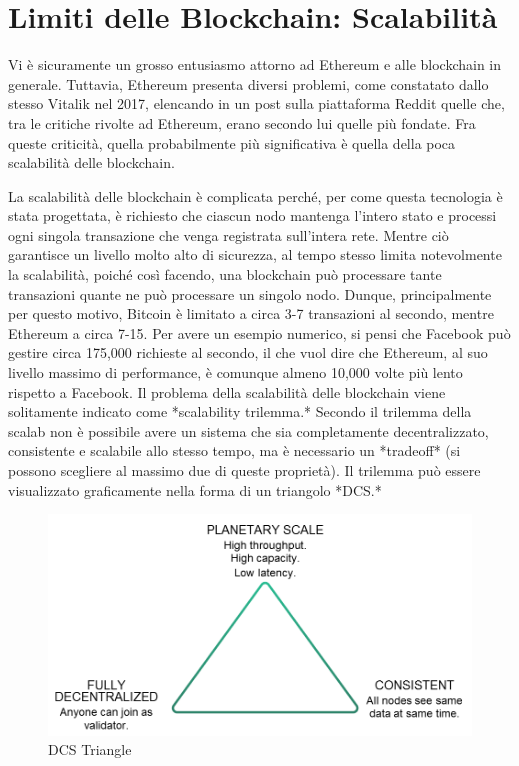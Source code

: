 \section{Limiti delle Blockchain: Scalabilità}

Vi è sicuramente un grosso entusiasmo attorno ad Ethereum e alle blockchain in generale. Tuttavia, Ethereum presenta diversi problemi, come constatato dallo stesso Vitalik nel 2017, elencando in un post sulla piattaforma Reddit quelle che, tra le critiche rivolte ad Ethereum, erano secondo lui quelle più fondate. Fra queste criticità, quella probabilmente più significativa è quella della poca scalabilità delle blockchain.

La scalabilità delle blockchain è complicata perché, per come questa tecnologia è stata progettata, è richiesto che ciascun nodo mantenga l'intero stato e processi ogni singola transazione che venga registrata sull'intera rete. Mentre ciò garantisce un livello molto alto di sicurezza, al tempo stesso limita notevolmente la scalabilità, poiché così facendo, una blockchain può processare tante transazioni quante ne può processare un singolo nodo. Dunque, principalmente per questo motivo, Bitcoin è limitato a circa 3-7 transazioni al secondo, mentre Ethereum a circa 7-15. Per avere un esempio numerico, si pensi che Facebook può gestire circa 175,000 richieste al secondo, il che vuol dire che Ethereum, al suo livello massimo di performance, è comunque almeno 10,000 volte più lento rispetto a Facebook. 
Il problema della scalabilità delle blockchain viene solitamente indicato come *scalability trilemma.* Secondo il trilemma della scalab non è possibile avere un sistema che sia completamente decentralizzato, consistente e scalabile allo stesso tempo, ma è necessario un *tradeoff* (si possono scegliere al massimo due di queste proprietà). Il trilemma può essere visualizzato graficamente nella forma di un triangolo *DCS.*

\begin{figure}
    \includegraphics[width=\linewidth]{images/dcs-triangle.png}
    \caption{DCS Triangle}
    \label{fig:dcs_triangle}
\end{figure}

